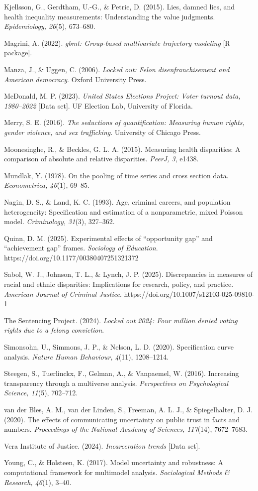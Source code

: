 \documentclass[
  12pt,
]{article}
\begin{document}
Kjellsson, G., Gerdtham, U.-G., \& Petrie, D. (2015). Lies, damned lies,
and health inequality measurements: Understanding the value judgments.
\emph{Epidemiology, 26}(5), 673--680.

Magrini, A. (2022). \emph{gbmt: Group-based multivariate trajectory
modeling} {[}R package{]}.

Manza, J., \& Uggen, C. (2006). \emph{Locked out: Felon
disenfranchisement and American democracy}. Oxford University Press.

McDonald, M. P. (2023). \emph{United States Elections Project: Voter
turnout data, 1980--2022} {[}Data set{]}. UF Election Lab, University of
Florida.

Merry, S. E. (2016). \emph{The seductions of quantification: Measuring
human rights, gender violence, and sex trafficking}. University of
Chicago Press.

Moonesinghe, R., \& Beckles, G. L. A. (2015). Measuring health
disparities: A comparison of absolute and relative disparities.
\emph{PeerJ, 3}, e1438.

Mundlak, Y. (1978). On the pooling of time series and cross section
data. \emph{Econometrica, 46}(1), 69--85.

Nagin, D. S., \& Land, K. C. (1993). Age, criminal careers, and
population heterogeneity: Specification and estimation of a
nonparametric, mixed Poisson model. \emph{Criminology, 31}(3), 327--362.

Quinn, D. M. (2025). Experimental effects of ``opportunity gap'' and
``achievement gap'' frames. \emph{Sociology of Education}.
https://doi.org/10.1177/00380407251321372

Sabol, W. J., Johnson, T. L., \& Lynch, J. P. (2025). Discrepancies in
measures of racial and ethnic disparities: Implications for research,
policy, and practice. \emph{American Journal of Criminal Justice}.
https://doi.org/10.1007/s12103-025-09810-1

The Sentencing Project. (2024). \emph{Locked out 2024: Four million
denied voting rights due to a felony conviction}.

Simonsohn, U., Simmons, J. P., \& Nelson, L. D. (2020). Specification
curve analysis. \emph{Nature Human Behaviour, 4}(11), 1208--1214.

Steegen, S., Tuerlinckx, F., Gelman, A., \& Vanpaemel, W. (2016).
Increasing transparency through a multiverse analysis.
\emph{Perspectives on Psychological Science, 11}(5), 702--712.

van der Bles, A. M., van der Linden, S., Freeman, A. L. J., \&
Spiegelhalter, D. J. (2020). The effects of communicating uncertainty on
public trust in facts and numbers. \emph{Proceedings of the National
Academy of Sciences, 117}(14), 7672--7683.

Vera Institute of Justice. (2024). \emph{Incarceration trends} {[}Data
set{]}.

Young, C., \& Holsteen, K. (2017). Model uncertainty and robustness: A
computational framework for multimodel analysis. \emph{Sociological
Methods \& Research, 46}(1), 3--40.

\endgroup
\end{document}
